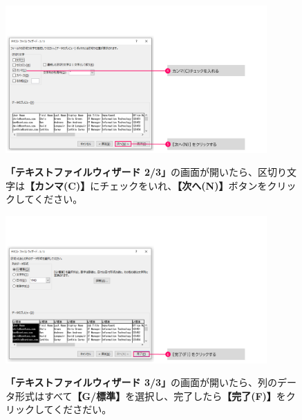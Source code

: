 \begin{figure}[h]
    \begin{minipage}{0.6\textwidth}
        \vspace{-1cm}
        \includegraphics[width=10cm]{figures/CSV_Import-2.png}
    \end{minipage}
    \begin{minipage}{0.4\textwidth}
        \textbf{「テキストファイルウィザード 2/3」}の画面が開いたら、区切り文字は\textbf{【カンマ(C)】}にチェックをいれ、\textbf{【次へ(N)】}ボタンをクリックしてください。
    \end{minipage}
\end{figure}

\begin{figure}[h]
    \begin{minipage}{0.6\textwidth}
        \vspace{-1cm}
        \includegraphics[width=10cm]{figures/CSV_Import-3.png}
    \end{minipage}
    \begin{minipage}{0.4\textwidth}
        \textbf{「テキストファイルウィザード 3/3」}の画面が開いたら、列のデータ形式はすべて\textbf{【G/標準】}を選択し、完了したら\textbf{【完了(F)】}をクリックしてくださだい。
    \end{minipage}
\end{figure}

